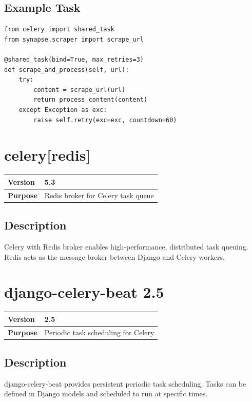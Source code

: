 \documentclass[12pt,a4paper]{report}
\begin{document}
\subsection{Example Task}

\begin{lstlisting}
from celery import shared_task
from synapse.scraper import scrape_url

@shared_task(bind=True, max_retries=3)
def scrape_and_process(self, url):
    try:
        content = scrape_url(url)
        return process_content(content)
    except Exception as exc:
        raise self.retry(exc=exc, countdown=60)
\end{lstlisting}

\section{celery[redis]}

\begin{tabular}{|p{4cm}|p{10cm}|}
\hline
\textbf{Version} & 5.3 \\
\hline
\textbf{Purpose} & Redis broker for Celery task queue \\
\hline
\end{tabular}

\subsection{Description}

Celery with Redis broker enables high-performance, distributed task queuing. Redis acts as the message broker between Django and Celery workers.

\section{django-celery-beat 2.5}

\begin{tabular}{|p{4cm}|p{10cm}|}
\hline
\textbf{Version} & 2.5 \\
\hline
\textbf{Purpose} & Periodic task scheduling for Celery \\
\hline
\end{tabular}

\subsection{Description}

django-celery-beat provides persistent periodic task scheduling. Tasks can be defined in Django models and scheduled to run at specific times.
\end{document}
